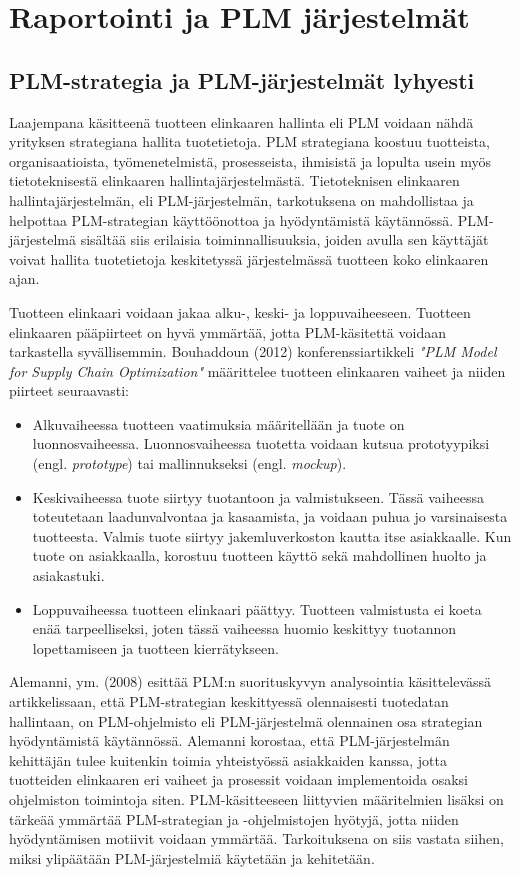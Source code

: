 \chapter{Raportointi ja PLM järjestelmät} \label{Raportointi ja PLM järjestelmät}

\section{PLM-strategia ja PLM-järjestelmät lyhyesti} \label{PLM-strategia ja PLM-järjestelmät lyhyesti}

Laajempana käsitteenä tuotteen elinkaaren hallinta eli PLM voidaan nähdä yrityksen strategiana hallita tuotetietoja. PLM strategiana koostuu tuotteista, organisaatioista, työmenetelmistä, prosesseista, ihmisistä ja lopulta usein myös tietoteknisestä elinkaaren hallintajärjestelmästä. Tietoteknisen elinkaaren hallintajärjestelmän, eli PLM-järjestelmän, tarkotuksena on mahdollistaa ja helpottaa PLM-strategian käyttöönottoa ja hyödyntämistä käytännössä. PLM-järjestelmä sisältää siis erilaisia toiminnallisuuksia, joiden avulla sen käyttäjät voivat hallita tuotetietoja keskitetyssä järjestelmässä tuotteen koko elinkaaren ajan.

Tuotteen elinkaari voidaan jakaa alku-, keski- ja loppuvaiheeseen. Tuotteen elinkaaren pääpiirteet on hyvä ymmärtää, jotta PLM-käsitettä voidaan tarkastella syvällisemmin. Bouhaddoun (2012) konferenssiartikkeli \textit{"PLM Model for Supply Chain Optimization"} määrittelee tuotteen elinkaaren vaiheet ja niiden piirteet seuraavasti:  \cite{bouhaddou_plm_2012}
\begin{itemize}
\item Alkuvaiheessa tuotteen vaatimuksia määritellään ja tuote on luonnosvaiheessa. Luonnosvaiheessa tuotetta voidaan kutsua prototyypiksi (engl. \textit{prototype}) tai mallinnukseksi (engl. \textit{mockup}).
\item Keskivaiheessa tuote siirtyy tuotantoon ja valmistukseen. Tässä vaiheessa toteutetaan laadunvalvontaa ja kasaamista, ja voidaan puhua jo varsinaisesta tuotteesta. Valmis tuote siirtyy jakemluverkoston kautta itse asiakkaalle. Kun tuote on asiakkaalla, korostuu tuotteen käyttö sekä mahdollinen huolto ja asiakastuki.
\item Loppuvaiheessa tuotteen elinkaari päättyy. Tuotteen valmistusta ei koeta enää tarpeelliseksi, joten tässä vaiheessa huomio keskittyy tuotannon lopettamiseen ja tuotteen kierrätykseen.
\end{itemize}
Alemanni, ym. (2008) esittää PLM:n suorituskyvyn analysointia käsittelevässä artikkelissaan, että PLM-strategian keskittyessä olennaisesti tuotedatan hallintaan, on PLM-ohjelmisto eli PLM-järjestelmä olennainen osa strategian hyödyntämistä käytännössä.  \cite{alemanni_key_2008} Alemanni korostaa, että PLM-järjestelmän kehittäjän tulee kuitenkin toimia yhteistyössä asiakkaiden kanssa, jotta tuotteiden elinkaaren eri vaiheet ja prosessit voidaan implementoida osaksi ohjelmiston toimintoja siten. PLM-käsitteeseen liittyvien määritelmien lisäksi on tärkeää ymmärtää PLM-strategian ja -ohjelmistojen hyötyjä, jotta niiden hyödyntämisen motiivit voidaan ymmärtää. Tarkoituksena on siis vastata siihen, miksi ylipäätään PLM-järjestelmiä käytetään ja kehitetään.

